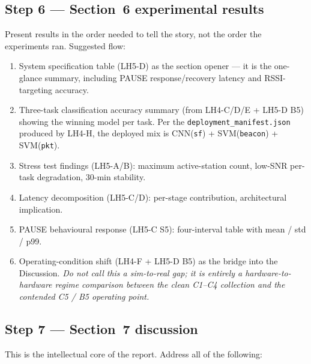 \documentclass[11pt,letterpaper]{article}
\begin{document}
\subsection{Step 6 --- Section~6 experimental results}
Present results in the order needed to tell the story, not the order the experiments ran. Suggested flow:
\begin{enumerate}[leftmargin=2em]
	\item System specification table (LH5-D) as the section opener --- it is the one-glance summary, including PAUSE response/recovery latency and RSSI-targeting accuracy.
	\item Three-task classification accuracy summary (from LH4-C/D/E + LH5-D B5) showing the winning model per task. Per the \texttt{deployment\_manifest.json} produced by LH4-H, the deployed mix is CNN(\texttt{sf}) + SVM(\texttt{beacon}) + SVM(\texttt{pkt}).
	\item Stress test findings (LH5-A/B): maximum active-station count, low-\mbox{SNR} per-task degradation, 30-min stability.
	\item Latency decomposition (LH5-C/D): per-stage contribution, architectural implication.
	\item PAUSE behavioural response (LH5-C S5): four-interval table with mean / std / p99.
	\item Operating-condition shift (LH4-F + LH5-D B5) as the bridge into the Discussion. \emph{Do not call this a sim-to-real gap; it is entirely a hardware-to-hardware regime comparison between the clean C1--C4 collection and the contended C5 / B5 operating point.}
\end{enumerate}

\subsection{Step 7 --- Section~7 discussion}
This is the intellectual core of the report. Address all of the following:
\end{document}
